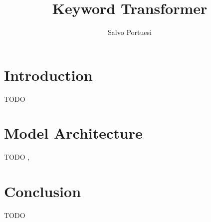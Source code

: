 \documentclass[11pt, a4paper]{article}
\title{Keyword Transformer}
\author{Salvo Portuesi}
\date{}
\begin{document}
\maketitle

\section{Introduction}

TODO

\section{Model Architecture}

TODO \cite{Berg_2021}, \cite{gong2021astaudiospectrogramtransformer}

\section{Conclusion}

TODO



\end{document}
